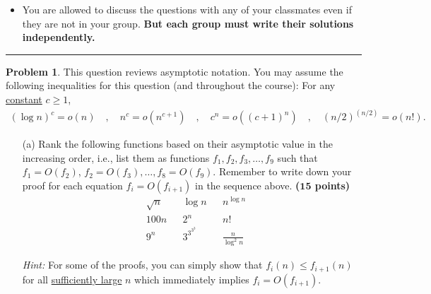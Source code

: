 \documentclass{article}
\theoremstyle{definition}
\newtheorem{problem}{Problem}
\def\fline{\rule{0.75\linewidth}{0.5pt}}
\newcommand{\finishline}{\begin{center}\fline\end{center}}
\newtheorem*{solution*}{Solution}
\newenvironment{solution}{\begin{solution*}}{{\finishline} \end{solution*}}
\newcommand{\grade}[1]{\hfill{\textbf{($\mathbf{#1}$ points)}}}
\begin{document}
\begin{itemize}
\begin{itemize}
\item You are allowed to discuss the questions with any of your classmates even if they are not in your group. \textbf{But each group must write their solutions independently.} 
\end{itemize}


\end{itemize}

\finishline

\newpage



\bigskip

\begin{problem}
	This question reviews asymptotic notation. You may assume the following inequalities for this question (and throughout the course): For any \underline{constant} $c \geq 1$, 
	\begin{align*}
		(\log{n})^c = o(n) \quad,\quad n^c = o(n^{c+1}) \quad,\quad c^n = o((c+1)^n) \quad,\quad (n/2)^{(n/2)} = o(n!).
	\end{align*}
	\begin{enumerate}
	\item[(a)] Rank the following functions based on their asymptotic value in the increasing order, i.e., list them as functions $f_1,f_2,f_3,\ldots,f_{9}$ such that $f_1 = O(f_2)$, $f_2 = O(f_3), \ldots, f_{8} = O(f_{9})$. Remember to write down your proof
	for each equation $f_i = O(f_{i+1})$ in the sequence above.  \grade{15}
	\begin{align*}
		&\sqrt{{n}} &&\log{n} &&n^{{\log{n}}}  \\ 
		&100n   &&2^{n} &&n! \\ 
		&9^{n} && 3^{{3}^{{3}^{3}}} &&\frac{n}{\log^2{n}} 
	\end{align*}
	
	\smallskip 
	\emph{Hint:} For some of the proofs, you can simply show that $f_i(n) \leq f_{i+1}(n)$ for all \underline{sufficiently large} $n$ which immediately implies $f_i = O(f_{i+1})$. 


\end{enumerate}
\end{problem}
\end{document}
